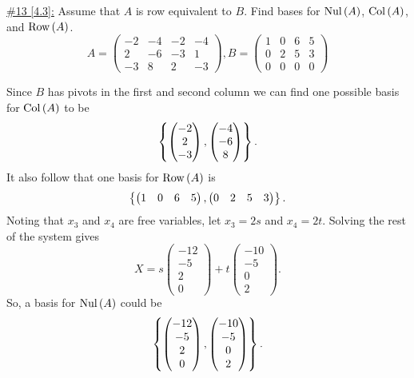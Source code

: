\documentclass{exam}
\begin{document}
\underline{\#13 [4.3]:} Assume that $A$ is row equivalent to $B$. Find bases for $\text{Nul}\left(A\right)$, $\text{Col}\left(A\right)$, and $\text{Row}\left(A\right)$.
\[
    A = \begin{pmatrix}
        -2 & -4 & -2 & -4 \\
        2 & -6 & -3 & 1 \\
        -3 & 8 & 2 & -3
    \end{pmatrix}, 
    B = \begin{pmatrix}
        1 & 0 & 6 & 5 \\
        0 & 2 & 5 & 3 \\
        0 & 0 & 0 & 0
    \end{pmatrix}
\]
\begin{solution}
    Since $B$ has pivots in the first and second column we can find one possible basis for $\text{Col}\left(A\right)$ to be 
    \[
        \left\{
            \begin{pmatrix}
                -2 \\ 2 \\ -3
            \end{pmatrix},
            \begin{pmatrix}
                -4 \\ -6 \\ 8
            \end{pmatrix}
         \right\}. 
    \]
    It also follow that one basis for $\text{Row}\left(A\right)$ is 
    \[
        \left\{
            \begin{pmatrix}
                1 & 0 & 6 & 5
            \end{pmatrix}, 
            \begin{pmatrix}
                0 & 2 & 5 & 3
            \end{pmatrix}
         \right\}.
    \]
    Noting that $x_3$ and $x_4$ are free variables, let $x_3 = 2s$ and $x_4 = 2t$. Solving the rest of the system gives 
    \[
        X = s\begin{pmatrix}
            -12 \\ -5 \\ 2 \\ 0
        \end{pmatrix}
        + t\begin{pmatrix}
            -10 \\ -5 \\ 0 \\ 2
        \end{pmatrix}.
    \]
    So, a basis for $\text{Nul}\left(A\right)$ could be 
    \[
        \left\{
            \begin{pmatrix}
                -12 \\ -5 \\ 2 \\ 0
            \end{pmatrix},
            \begin{pmatrix}
                -10 \\ -5 \\ 0 \\ 2
            \end{pmatrix}
         \right\}.
    \]
\end{solution}
\end{document}

